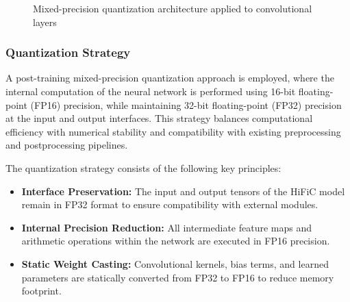 \begin{figure}[H]
\caption{Mixed-precision quantization architecture applied to convolutional layers}
\label{fig:quantize_arch_final_clean}
\end{figure}




\subsubsection{Quantization Strategy}

A post-training mixed-precision quantization approach is employed, where the internal computation of the neural network is performed using 16-bit floating-point (FP16) precision, while maintaining 32-bit floating-point (FP32) precision at the input and output interfaces. This strategy balances computational efficiency with numerical stability and compatibility with existing preprocessing and postprocessing pipelines.

The quantization strategy consists of the following key principles:
\begin{itemize}
    \item \textbf{Interface Preservation:} The input and output tensors of the HiFiC model remain in FP32 format to ensure compatibility with external modules.
    \item \textbf{Internal Precision Reduction:} All intermediate feature maps and arithmetic operations within the network are executed in FP16 precision.
    \item \textbf{Static Weight Casting:} Convolutional kernels, bias terms, and learned parameters are statically converted from FP32 to FP16 to reduce memory footprint.
\end{itemize}

